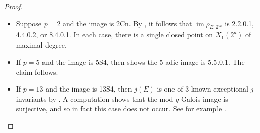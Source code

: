 \documentclass{amsart}
\theoremstyle{definition}
\newcommand{\Q}{\mathbb{Q}}
\newcommand{\Z}{\mathbb{Z}}
\newcommand{\GL}{\operatorname{GL}}
\DeclareMathOperator{\im}{im}
\begin{document}
\begin{proof}
\begin{itemize}
\begin{enumerate}
            \[ G \pmod{p^2} \cong C_{\text{ns}}^+(p) \ltimes \left\lbrace I + p\begin{bmatrix}
a& \epsilon b\\
-b & c
\end{bmatrix}\right \rbrace \] 
where $\epsilon$ is a fixed integer which is not a quadratic residue modulo $p$. 
            Let $F=\Q(E[p])$. In this case, there is a choice of basis $\{P,Q\}$ for $E[p^2]$ such that the image of $\rho_{E/F,p^2}$ is $\left\{I + p \begin{pmatrix} a & \epsilon b \\ -b & c
            \end{pmatrix}\right\} \leq \GL_2(\Z/p^2\Z)$. An element of this form fixes the first basis element if and only if it is one of the $p$ matrices of the form
            \[
            \begin{pmatrix} 1 & 0 \\ 0 & 1+pc
            \end{pmatrix}.
            \] Thus $F(P)/F$ has degree $p^2$, which means $\Q(P)/\Q(pP)$ has degree $p^2$. Since $[\Q(pP):\Q]$ has degree $p^2-1$, it follows that $\Q(P)$ has largest possible degree and all elements of order $p^2$ are in a single Galois orbit. The claim now follows from \cite[Theorem 5.1]{BELOV}.
\end{enumerate}
        \item Suppose $p=2$ and the image is 2Cn. By \cite{2adicImage}, it follows that $\im \rho_{E,2^{\infty}}$ is 2.2.0.1, 4.4.0.2, or 8.4.0.1. In each case, there is a single closed point on $X_1(2^a)$ of maximal degree.
        \item If $p=5$ and the image is 5S4, then \cite{RouseSutherlandZB22} shows the 5-adic image is 5.5.0.1. The claim follows. 
        \item If $p=13$ and the image is 13S4, then $j(E)$ is one of 3 known exceptional $j$-invariants by \cite[$\S5.1$]{17adic}. A computation shows that the mod $q$ Galois image is surjective, and so in fact this case does not occur. See for example \cite[Lemma 17]{MayleIsogenyPaper}.\qedhere
    \end{itemize}
\end{proof}
\end{document}
